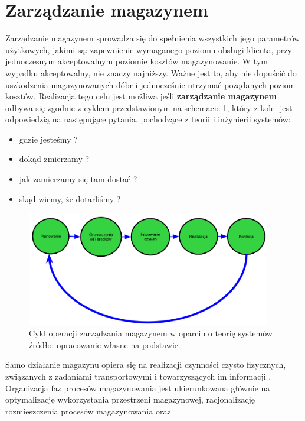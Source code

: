 \section{Zarządzanie magazynem}
	Zarządzanie magazynem sprowadza się do spełnienia wszystkich jego parametrów użyt\-kowych, jakimi są:
	zapewnienie wymaganego poziomu obsługi klienta, przy jednoczesnym akceptowalnym poziomie kosztów magazynowanie.
	W tym wypadku akceptowalny, nie znaczy najniższy. Ważne jest to, aby nie dopuścić do uszkodzenia magazynowanych
	dóbr i jednocześnie utrzymać pożądanych poziom kosztów.
	Realizacja tego celu jest możliwa jeśli \textbf{zarządzanie magazynem} odbywa się zgodnie z cyklem
	przedstawionym na schemacie \ref{fig:warehouse_management_algorithm}, który z kolei jest odpowiedzią na
	następujące pytania, pochodzące z teorii i inżynierii systemów:
	\begin{itemize}
		\item gdzie jesteśmy ?
		\item dokąd zmierzamy ?
		\item jak zamierzamy się tam dostać ?
		\item skąd wiemy, że dotarliśmy ?
	\end{itemize}
	\begin{figure}[H]
		\centering
		\includegraphics[width=0.95\textwidth]{images/warehouse_management_algorithm_2}
		\caption[Cykl operacji zarządzania magazynem]{
			Cykl operacji zarządzania magazynem w oparciu o teorię systemów \\
			źródło: opracowanie własne na podstawie \cite{PZMW}
		}
		\label{fig:warehouse_management_algorithm}
	\end{figure}
	Samo działanie magazynu opiera się na realizacji czynności czysto fizycznych, związanych z zadaniami transportowymi 
	i towarzyszących im informacji \cite{PZMW}. Organizacja faz procesów magazynowania jest ukierunkowana głównie na
	optymalizację wykorzystania przestrzeni magazynowej, racjonalizację rozmieszczenia procesów magazynowania oraz
